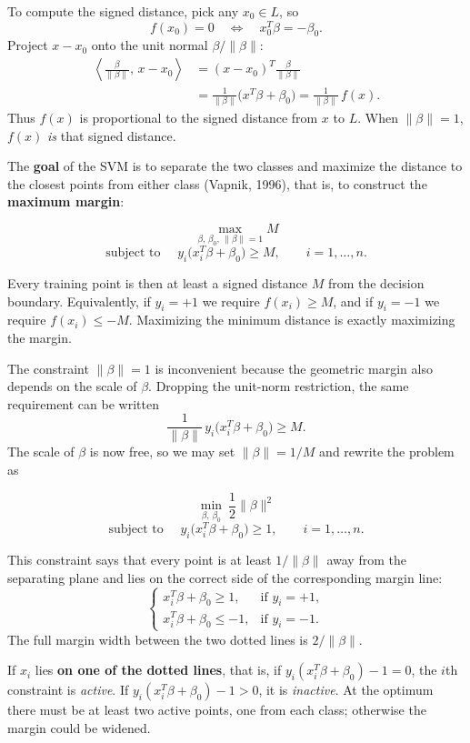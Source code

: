 \documentclass[
]{book}
\begin{document}
To compute the signed distance, pick any \(x_0\in L\), so
\[
f(x_0)=0 \quad\Leftrightarrow\quad x_0^T\beta = -\beta_0.
\]
Project \(x-x_0\) onto the unit normal \(\beta/\|\beta\|\):
\begin{align*}
\left\langle \frac{\beta}{\|\beta\|},\, x-x_0 \right\rangle
&= (x-x_0)^T \frac{\beta}{\|\beta\|}\\
&= \frac{1}{\|\beta\|}\bigl(x^T\beta + \beta_0\bigr)
= \frac{1}{\|\beta\|}\, f(x).
\end{align*}
Thus \(f(x)\) is proportional to the signed distance from \(x\) to \(L\). When \(\|\beta\|=1\), \(f(x)\) \emph{is} that signed distance.

The \textbf{goal} of the SVM is to separate the two classes and maximize the distance to the closest points from either class (Vapnik, 1996), that is, to construct the \textbf{maximum margin}:

\[
\max_{\beta,\,\beta_0,\,\|\beta\|=1} M
\]
\[
\text{subject to }\quad
y_i\bigl(x_i^T\beta + \beta_0\bigr) \ge M,\qquad i=1,\ldots,n.
\]

Every training point is then at least a signed distance \(M\) from the decision boundary. Equivalently, if \(y_i=+1\) we require \(f(x_i)\ge M\), and if \(y_i=-1\) we require \(f(x_i)\le -M\). Maximizing the minimum distance is exactly maximizing the margin.

The constraint \(\|\beta\|=1\) is inconvenient because the geometric margin also depends on the scale of \(\beta\). Dropping the unit-norm restriction, the same requirement can be written
\[
\frac{1}{\|\beta\|}\, y_i\bigl(x_i^T\beta + \beta_0\bigr) \ge M.
\]
The scale of \(\beta\) is now free, so we may set \(\|\beta\|=1/M\) and rewrite the problem as

\[
\min_{\beta,\,\beta_0}\ \frac12\|\beta\|^2
\]
\[
\text{subject to }\quad
y_i\bigl(x_i^T\beta + \beta_0\bigr) \ge 1,\qquad i=1,\ldots,n.
\]

This constraint says that every point is at least \(1/\|\beta\|\) away from the separating plane and lies on the correct side of the corresponding margin line:
\[
\begin{cases}
x_i^T\beta + \beta_0 \ge 1, & \text{if } y_i = +1,\\
x_i^T\beta + \beta_0 \le -1, & \text{if } y_i = -1.
\end{cases}
\]
The full margin width between the two dotted lines is \(2/\|\beta\|\).

If \(x_i\) lies \textbf{on one of the dotted lines}, that is, if \(y_i(x_i^T\beta+\beta_0)-1=0\), the \(i\)th constraint is \emph{active}. If \(y_i(x_i^T\beta+\beta_0)-1>0\), it is \emph{inactive}. At the optimum there must be at least two active points, one from each class; otherwise the margin could be widened.
\end{document}
